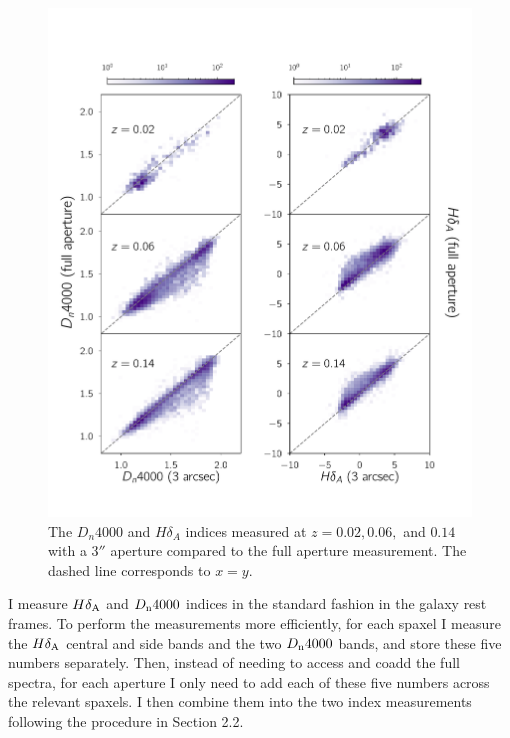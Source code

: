 \begin{figure}
\includegraphics[width=\textwidth]{figures/full_aperture_comparisons.pdf}
\caption[The $D_{n}4000$, $h\delta_{A}$ indices measured at 
$z = 0.02,0.06,0.14$ with a $3''$ aperture compared to the full aperture measurement]
{ The $D_{n}4000$ and $H\delta_{A}$ indices measured 
at $z = 0.02,0.06,$ and $0.14$ with a $3''$ aperture 
compared to the full aperture measurement. The dashed line corresponds
to $x=y$.
\label{fig:redshift_comparison}}
\end{figure}


I measure $H\delta_{\rm A}$ and $D_{\rm n}4000$ indices in the standard
fashion in the galaxy rest frames. To perform the measurements more 
efficiently, for each spaxel I measure the $H\delta_{\rm A}$ central
and side bands and the two $D_{\rm n}4000$ bands, and store these five
numbers separately. Then, instead of needing to access and coadd the full
spectra, for each aperture I only need to add each of these five numbers
across the relevant spaxels. I then combine them into the two index
measurements following the procedure in Section 2.2.

